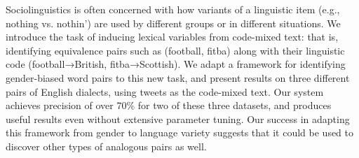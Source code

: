 Sociolinguistics is often concerned with how variants of a linguistic item (e.g., nothing vs. nothin') are used by different groups or in different situations. We introduce the task of inducing lexical variables from code-mixed text: that is, identifying equivalence pairs such as (football, fitba) along with their linguistic code (football→British, fitba→Scottish). We adapt a framework for identifying gender-biased word pairs to this new task, and present results on three different pairs of English dialects, using tweets as the code-mixed text. Our system achieves precision of over 70\% for two of these three datasets, and produces useful results even without extensive parameter tuning. Our success in adapting this framework from gender to language variety suggests that it could be used to discover other types of analogous pairs as well.
